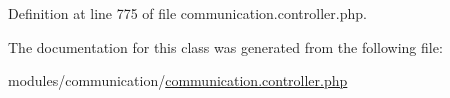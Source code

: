 Definition at line 775 of file communication.\-controller.\-php.



The documentation for this class was generated from the following file\-:\begin{DoxyCompactItemize}
\item 
modules/communication/\hyperlink{communication_8controller_8php}{communication.\-controller.\-php}\end{DoxyCompactItemize}
